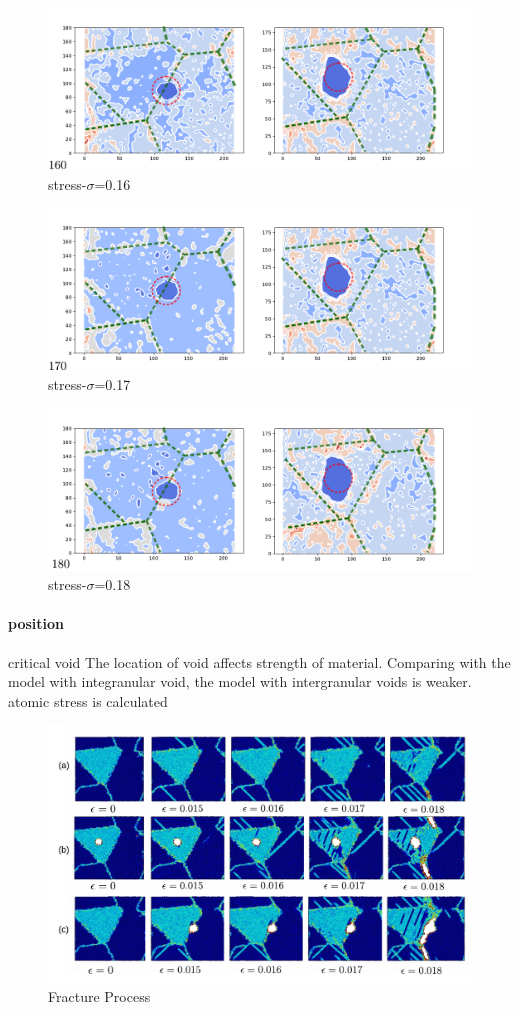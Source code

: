 \documentclass[times,12pt]{elsarticle}
\begin{document}
\begin{figure}[h]
	\centering
	\includegraphics[width=0.7\linewidth]{img/frame160}
	\caption{stress-$\sigma$=0.16}
	\label{ }
\end{figure}

\begin{figure}[h]
	\centering
	\includegraphics[width=0.7\linewidth]{img/frame170}
	\caption{stress-$\sigma$=0.17}
	\label{ }
\end{figure}


\begin{figure}[h]
	\centering
	\includegraphics[width=0.7\linewidth]{img/frame180}
	\caption{stress-$\sigma$=0.18}
	\label{ }
\end{figure}
\paragraph{position}critical void 
The location of void affects strength of material. Comparing with the model with integranular void, the model with intergranular voids is weaker. atomic stress is calculated 

\begin{figure}[h]
	\centering
	\includegraphics[width=1\linewidth]{"img/fracture3"}
	\caption{Fracture Process}
	\label{fig:fracture-process}
\end{figure}
\end{document}
